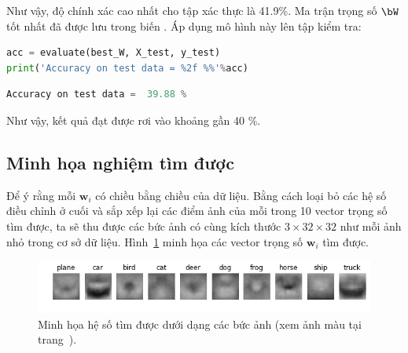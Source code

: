 Như vậy, độ chính xác cao nhất cho tập xác thực là 41.9\%. Ma trận trọng số $\bW$
tốt nhất đã được lưu trong biến . Áp dụng mô hình này lên
tập kiểm tra:
\begin{lstlisting}[language=Python]
acc = evaluate(best_W, X_test, y_test)
print('Accuracy on test data = %2f %%'%acc)
\end{lstlisting}
\kq 
\begin{lstlisting}[language=Python]
Accuracy on test data =  39.88 %
\end{lstlisting}
Như vậy, kết quả đạt được rơi vào khoảng gần 40 \%.

 
 
 
 
 
 
\subsection{Minh họa nghiệm tìm được}
 
Để ý rằng mỗi $\mathbf{w}_i$ có chiều bằng chiều của dữ liệu. Bằng cách loại bỏ các hệ số điều chỉnh ở cuối và sắp xếp lại các điểm ảnh của mỗi trong
10 vector trọng số tìm được, ta sẽ thu được các {bức ảnh} có cùng kích
thước $3\times 32\times32$ như mỗi ảnh nhỏ trong cơ sở dữ liệu.
Hình~\ref{fig:22_9} minh họa các vector trọng số $\mathbf{w}_i$ tìm được.
\begin{figure}[t]
\centering
    \includegraphics[width = \textwidth]{Chapters/09_SupportVectorMachines/22_multiclasssvm/learned_ws_2_gray.png}
    \caption[]{ Minh họa hệ số tìm được dưới dạng các bức ảnh (xem ảnh màu tại trang~\pageref{fig:22_9_c}).}
    \label{fig:22_9}
\end{figure}
 
